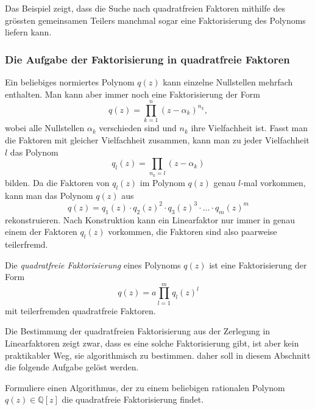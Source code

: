 Das Beispiel zeigt, dass die Suche nach quadratfreien Faktoren
mithilfe des grössten gemeinsamen Teilers manchmal sogar eine
Faktorisierung des Polynoms liefern kann.

%
%
\subsubsection{Die Aufgabe der Faktorisierung in quadratfreie Faktoren}
Ein beliebiges normiertes Polynom $q(z)$ kann einzelne Nullstellen
mehrfach enthalten.
Man kann aber immer noch eine Faktorisierung der Form
\[
q(z)
=
\prod_{k=1}^n
(z-\alpha_k)^{n_k},
\]
wobei alle Nullstellen $\alpha_k$ verschieden sind und $n_k$ ihre
Vielfachheit ist.
Fasst man die Faktoren mit gleicher Vielfachheit zusammen, kann man
zu jeder Vielfachheit $l$ das Polynom
\[
q_l(z) = \prod_{n_k=l} (z-\alpha_k)
\]
bilden.
Da die Faktoren von $q_l(z)$ im Polynom $q(z)$ genau $l$-mal vorkommen,
kann man das Polynom $q(z)$ aus
\[
q(z)
=
q_1(z)
\cdot
q_2(z)^2
\cdot
q_3(z)^3
\cdot
\ldots
\cdot
q_m(z)^m
\]
rekonstruieren.
Nach Konstruktion kann ein Linearfaktor nur immer in genau einem
der Faktoren $q_l(z)$ vorkommen, die Faktoren sind also paarweise
teilerfremd.

\begin{definition}
%
%
Die \emph{quadratfreie Faktorisierung} eines Polynoms $q(z)$ ist eine
Faktorisierung der Form
\[
q(z)
=
a
\prod_{l=1}^m q_l(z)^l
\]
mit teilerfremden quadratfreie Faktoren.
\end{definition}

Die Bestimmung der quadratfreien Faktorisierung aus der Zerlegung
in Linearfaktoren zeigt zwar, dass es eine solche Faktorisierung
gibt, ist aber kein praktikabler Weg, sie algorithmisch zu bestimmen.
daher soll in diesem Abschnitt die folgende Aufgabe gelöst werden.

\begin{aufgabe}
Formuliere einen Algorithmus, der zu einem beliebigen rationalen Polynom
$q(z)\in\mathbb{Q}[z]$ die quadratfreie Faktorisierung findet.
\end{aufgabe}

%
%
